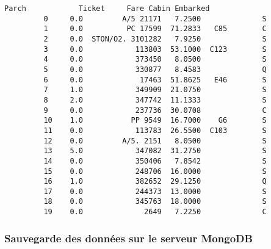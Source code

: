 \documentclass[11pt]{article}
\begin{document}
\begin{Verbatim}[commandchars=\\\{\}]
             Parch            Ticket     Fare Cabin Embarked  
         0     0.0         A/5 21171   7.2500              S  
         1     0.0          PC 17599  71.2833   C85        C  
         2     0.0  STON/O2. 3101282   7.9250              S  
         3     0.0            113803  53.1000  C123        S  
         4     0.0            373450   8.0500              S  
         5     0.0            330877   8.4583              Q  
         6     0.0             17463  51.8625   E46        S  
         7     1.0            349909  21.0750              S  
         8     2.0            347742  11.1333              S  
         9     0.0            237736  30.0708              C  
         10    1.0           PP 9549  16.7000    G6        S  
         11    0.0            113783  26.5500  C103        S  
         12    0.0         A/5. 2151   8.0500              S  
         13    5.0            347082  31.2750              S  
         14    0.0            350406   7.8542              S  
         15    0.0            248706  16.0000              S  
         16    1.0            382652  29.1250              Q  
         17    0.0            244373  13.0000              S  
         18    0.0            345763  18.0000              S  
         19    0.0              2649   7.2250              C  
\end{Verbatim}
            
    \hypertarget{sauvegarde-des-donnuxe9es-sur-le-serveur-mongodb}{%
\subsubsection{Sauvegarde des données sur le serveur
MongoDB}\label{sauvegarde-des-donnuxe9es-sur-le-serveur-mongodb}}
\end{document}
